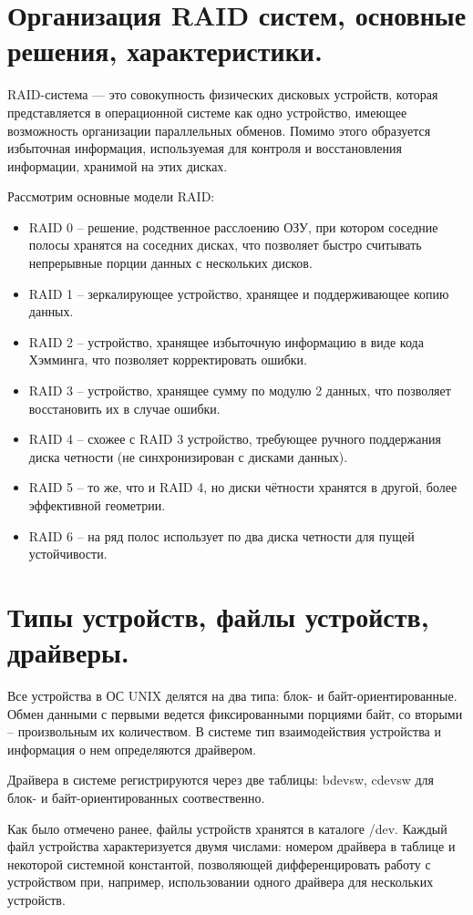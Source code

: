 \documentclass[a4paper,12pt,titlepage,finall]{article}
\begin{document}
\section{Организация RAID систем, основные решения,
характеристики.}
RAID-система — это совокупность физических дисковых устройств, которая представляется в операционной системе как одно устройство, имеющее возможность организации параллельных обменов. Помимо этого образуется избыточная информация, используемая для контроля и восстановления информации, хранимой на этих дисках.

Рассмотрим основные модели RAID:
\begin{itemize}
    \item RAID 0 -- решение, родственное расслоению ОЗУ, при котором соседние полосы хранятся на соседних дисках, что позволяет быстро считывать непрерывные порции данных с нескольких дисков.
    \item RAID 1 -- зеркалирующее устройство, хранящее и поддерживающее копию данных.
    \item RAID 2 -- устройство, хранящее избыточную информацию в виде кода Хэмминга, что позволяет корректировать ошибки.
    \item RAID 3 -- устройство, хранящее сумму по модулю 2 данных, что позволяет восстановить их в случае ошибки.
    \item RAID 4 -- схожее с RAID 3 устройство, требующее ручного поддержания диска четности (не синхронизирован с дисками данных).
    \item RAID 5 -- то же, что и RAID 4, но диски чётности хранятся в другой, более эффективной геометрии.
    \item RAID 6 -- на ряд полос использует по два диска четности для пущей устойчивости.
\end{itemize}

\section{Типы устройств, файлы устройств, драйверы.}
Все устройства в ОС UNIX делятся на два типа: блок- и байт-ориентированные. Обмен данными с первыми ведется фиксированными порциями байт, со вторыми -- произвольным их количеством. В системе тип взаимодействия устройства и информация о нем определяются драйвером.

Драйвера в системе регистрируются через две таблицы: bdevsw, cdevsw для блок- и байт-ориентированных соотвественно. 

Как было отмечено ранее, файлы устройств хранятся в каталоге /dev. Каждый файл устройства характеризуется двумя числами: номером драйвера в таблице и некоторой системной константой, позволяющей дифференцировать работу с устройством при, например, использовании одного драйвера для нескольких устройств.
\end{document}
